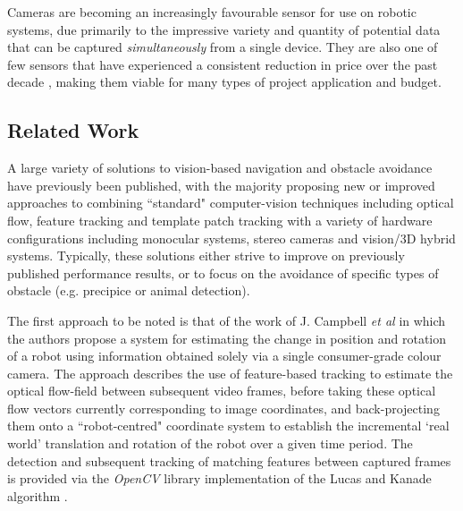 Cameras are becoming an increasingly favourable sensor for use on robotic systems, due primarily to the impressive variety and quantity of potential data that can be captured \textit{simultaneously} from a single device. They are also one of few sensors that have experienced a consistent reduction in price over the past decade \cite{campbell}, making them viable for many types of project application and budget. 


\subsection{Related Work}

A large variety of solutions to vision-based navigation and obstacle avoidance have previously been published, with the majority proposing new or improved approaches to combining ``standard" computer-vision techniques including optical flow, feature tracking and template patch tracking with a variety of hardware configurations including monocular systems, stereo cameras and vision/3D hybrid systems. Typically, these solutions either strive to improve on previously published performance results, or to focus on the avoidance of specific types of obstacle (e.g. precipice or animal detection). 


The first approach to be noted is that of the work of J. Campbell \textit{et al} \cite{campbell} in which the authors propose a system for estimating the change in position and rotation of a robot using information obtained solely via a single consumer-grade colour camera. The approach describes the use of feature-based tracking to estimate the optical flow-field between subsequent video frames, before taking these optical flow vectors currently corresponding to image coordinates, and back-projecting them onto a ``robot-centred" coordinate system to establish the incremental `real world' translation and rotation of the robot over a given time period. The detection and subsequent tracking of matching features between captured frames is provided via the \textit{OpenCV} library implementation of the Lucas and Kanade algorithm \cite{opencv-lucas-kanade-features}. 

